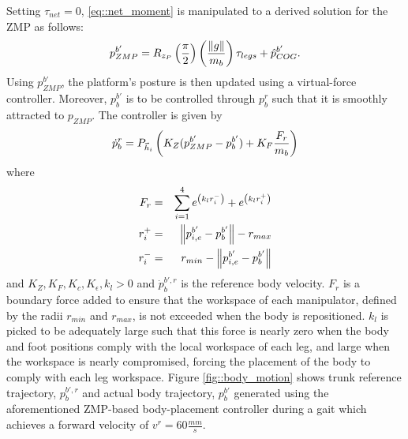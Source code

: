		Setting $\tau_{net}=0$, \ref{eq::net_moment} is manipulated to a derived solution for the ZMP as follows:
			\begin{equation}
				{p}_{ZMP}^{b'} = R_{z_P} \left(\frac{\pi}{2}\right)  \left( \frac{\left\lVert g\right\rVert}{m_{b}}\right) \tau_{legs} + \hat{p}_{COG}^{b'}.
				\label{eq::ZMPFromMoment}
			\end{equation}
		Using ${p}_{ZMP}^{b'}$, the platform's posture is then updated using a virtual-force controller. Moreover, ${p}_{b}^{b'}$ is to be controlled through  ${p}_{b}^{r}$ such that it is smoothly attracted to ${p}_{ZMP}$. The controller is given by
			\begin{equation}
				\dot{p}_{b}^{r} 	= {P}_{\vec{h}_{i}} \left(K_{Z}	( {p}_{ZMP}^{b'} - {p}_{b}^{b'} )  
				+ K_{F}\frac{F_{r}}{m_{b}}  \right)
				\label{eq::ZMPController}
			\end{equation}	
		where
			\begin{eqnarray*}
				F_{r} 	& = &  \sum_{i=1}^{4}  e^{\left( k_{l} r_{i}^{-} \right) } + e^{ \left( k_{l} r_{i}^{+} \right) } \nonumber \\
				r_{i}^{+}	& = & \left\lVert{p}_{i,e}^{b'}- {p}_{b}^{b'}\right\rVert - r_{max} \nonumber \\
				r_{i}^{-}	& = & r_{min} - \left\lVert{p}_{i,e}^{b'}- {p}_{b}^{b'}\right\rVert \nonumber
			\end{eqnarray*}
		and $K_{Z}, K_{F}, K_{c}, K_{\epsilon}, k_{l} > 0$ and $\dot{p}_{b}^{b',r}$ is the reference body velocity. $F_{r}$ is a boundary force added to ensure that the workspace of each manipulator, defined by the radii $r_{min}$ and $r_{max}$, is not exceeded when the body is repositioned. $k_{l}$ is picked to be adequately large such that this force is nearly zero when the body and foot positions comply with the local workspace of each leg, and large when the workspace is nearly compromised, forcing the placement of the body to comply with each leg workspace. Figure \ref{fig::body_motion} shows trunk reference trajectory, ${p}_{b}^{b',r}$ and actual body trajectory, ${p}_{b}^{b'}$ generated using the aforementioned ZMP-based body-placement controller during a gait which achieves a forward velocity of $v^{r}=60\frac{mm}{s}$.

